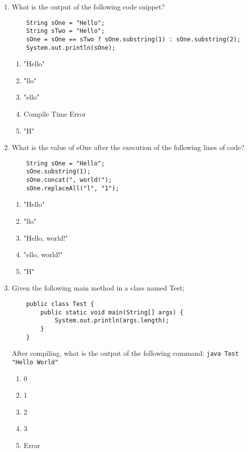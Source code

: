 \documentclass[S17-Final.tex]{subfiles}
\begin{document}
\begin{enumerate}
\clearpage

\item What is the output of the following code snippet?
\begin{lstlisting}
    String sOne = "Hello";
    String sTwo = "Hello";
    sOne = sOne == sTwo ? sOne.substring(1) : sOne.substring(2);
    System.out.println(sOne);
\end{lstlisting}

\begin{enumerate}
\item "Hello"
\item "llo"
\item "ello" \ifdraft \Ans \fi 
\item Compile Time Error
\item "H"
\end{enumerate}

\item What is the value of sOne after the execution of the following lines of code?
\begin{lstlisting}
    String sOne = "Hello";
    sOne.substring(1);
    sOne.concat(", world!");
    sOne.replaceAll("l", "1");
\end{lstlisting}

\begin{enumerate}
\item "Hello" \ifdraft \Ans \fi 
\item "llo"
\item "Hello, world!"
\item "ello, world!"
\item "H"
\end{enumerate}

\item Given the following main method in a class named Test;
\begin{lstlisting}
    public class Test {
	    public static void main(String[] args) {
		    System.out.println(args.length);
	    }
    }
\end{lstlisting}
	After compiling, what is the output of the following command: 
	\texttt{java Test "Hello World"}
\begin{enumerate}
\item 0
\item 1 \ifdraft \Ans \fi 
\item 2
\item 3
\item Error
\end{enumerate}


\end{enumerate}
\end{document}

